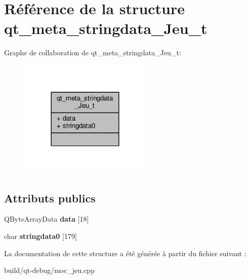 \hypertarget{structqt__meta__stringdata__Jeu__t}{}\section{Référence de la structure qt\+\_\+meta\+\_\+stringdata\+\_\+\+Jeu\+\_\+t}
\label{structqt__meta__stringdata__Jeu__t}


Graphe de collaboration de qt\+\_\+meta\+\_\+stringdata\+\_\+\+Jeu\+\_\+t\+:
\nopagebreak
\begin{figure}[H]
\begin{center}
\leavevmode
\includegraphics[width=180pt]{structqt__meta__stringdata__Jeu__t__coll__graph}
\end{center}
\end{figure}
\subsection*{Attributs publics}
\begin{DoxyCompactItemize}
\item 
Q\+Byte\+Array\+Data {\bfseries data} \mbox{[}18\mbox{]}\hypertarget{structqt__meta__stringdata__Jeu__t_a96fcfc1357ee0869eee9e7e160232ea2}{}\label{structqt__meta__stringdata__Jeu__t_a96fcfc1357ee0869eee9e7e160232ea2}

\item 
char {\bfseries stringdata0} \mbox{[}179\mbox{]}\hypertarget{structqt__meta__stringdata__Jeu__t_a5f5a37b9c8cd5255a2c1fe2d80417ce3}{}\label{structqt__meta__stringdata__Jeu__t_a5f5a37b9c8cd5255a2c1fe2d80417ce3}

\end{DoxyCompactItemize}


La documentation de cette structure a été générée à partir du fichier suivant \+:\begin{DoxyCompactItemize}
\item 
build/qt-\/debug/moc\+\_\+jeu.\+cpp\end{DoxyCompactItemize}
